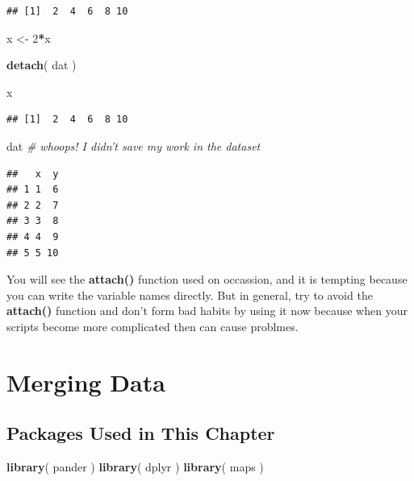 \documentclass[]{book}
\newenvironment{Shaded}{\begin{snugshade}}{\end{snugshade}}
\newcommand{\CommentTok}[1]{\textcolor[rgb]{0.56,0.35,0.01}{\textit{#1}}}
\newcommand{\DecValTok}[1]{\textcolor[rgb]{0.00,0.00,0.81}{#1}}
\newcommand{\KeywordTok}[1]{\textcolor[rgb]{0.13,0.29,0.53}{\textbf{#1}}}
\newcommand{\NormalTok}[1]{#1}
\newcommand{\OperatorTok}[1]{\textcolor[rgb]{0.81,0.36,0.00}{\textbf{#1}}}
\newcommand{\StringTok}[1]{\textcolor[rgb]{0.31,0.60,0.02}{#1}}
\theoremstyle{definition}
\theoremstyle{definition}
\theoremstyle{definition}
\theoremstyle{remark}
\begin{document}
\begin{verbatim}
## [1]  2  4  6  8 10
\end{verbatim}

\begin{Shaded}
\begin{Highlighting}[]
\NormalTok{x <-}\StringTok{ }\DecValTok{2}\OperatorTok{*}\NormalTok{x}

\KeywordTok{detach}\NormalTok{( dat )}

\NormalTok{x}
\end{Highlighting}
\end{Shaded}

\begin{verbatim}
## [1]  2  4  6  8 10
\end{verbatim}

\begin{Shaded}
\begin{Highlighting}[]
\NormalTok{dat  }\CommentTok{# whoops! I didn't save my work in the dataset}
\end{Highlighting}
\end{Shaded}

\begin{verbatim}
##   x  y
## 1 1  6
## 2 2  7
## 3 3  8
## 4 4  9
## 5 5 10
\end{verbatim}

You will see the \textbf{attach()} function used on occassion, and it is
tempting because you can write the variable names directly. But in
general, try to avoid the \textbf{attach()} function and don't form bad
habits by using it now because when your scripts become more complicated
then can cause problmes.

\hypertarget{merging-data}{%
\chapter{Merging Data}\label{merging-data}}

\hypertarget{packages-used-in-this-chapter}{%
\section{Packages Used in This
Chapter}\label{packages-used-in-this-chapter}}

\begin{Shaded}
\begin{Highlighting}[]
\KeywordTok{library}\NormalTok{( pander )}
\KeywordTok{library}\NormalTok{( dplyr )}
\KeywordTok{library}\NormalTok{( maps )}
\end{Highlighting}
\end{Shaded}
\end{document}
